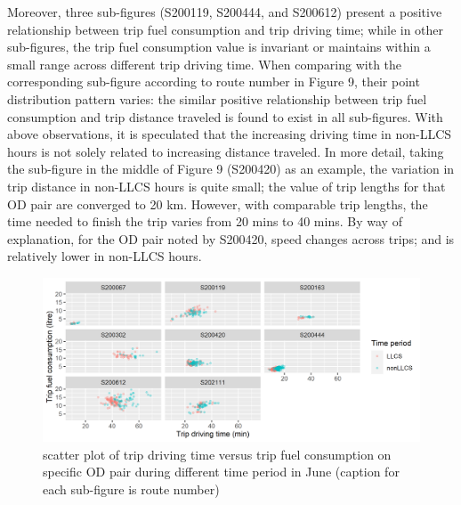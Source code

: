 \documentclass[preprint,12pt,3p]{elsarticle}
\begin{document}
Moreover, three sub-figures (S200119, S200444, and S200612) present a positive relationship between trip fuel consumption and trip driving time; while in other sub-figures, the trip fuel consumption value is invariant or maintains within a small range across different trip driving time. When comparing with the corresponding sub-figure according to route number in Figure 9, their point distribution pattern varies: the similar positive relationship between trip fuel consumption and trip distance traveled is found to exist in all sub-figures. With above observations, it is speculated that the increasing driving time in non-LLCS hours is not solely related to increasing distance traveled. In more detail, taking the sub-figure in the middle of Figure 9 (S200420) as an example, the variation in trip distance in non-LLCS hours is quite small; the value of trip lengths for that OD pair are converged to 20 km. However, with comparable trip lengths, the time needed to finish the trip varies from 20 mins to 40 mins. By way of explanation, for the OD pair noted by S200420, speed changes across trips; and is relatively lower in non-LLCS hours.


\begin{figure}[H] %
\centering %

\includegraphics[scale=0.9]{selecteroute_time_fuel.png} %
\caption{scatter plot of trip driving time versus trip fuel consumption on specific OD pair during different time period in June (caption for each sub-figure is route number)} 
\label{fig8}
\end{figure}
\end{document}
